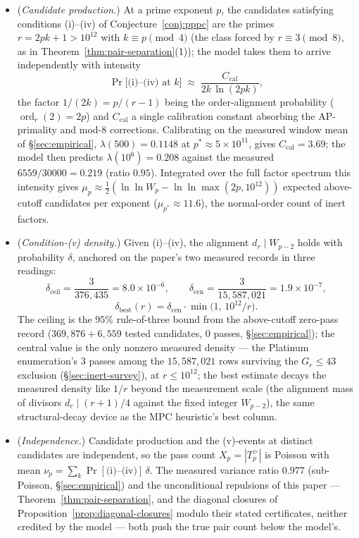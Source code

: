 \documentclass[11pt]{amsart}
\theoremstyle{plain}
\theoremstyle{definition}
\theoremstyle{remark}
\numberwithin{equation}{section}
\newcommand{\ord}{\operatorname{ord}}
\newcommand{\Prob}{\operatorname{Pr}}
\begin{document}
\begin{itemize}
\item[\textbf{M1}] (\emph{Candidate production.}) At a prime exponent
$p$, the candidates satisfying conditions (i)--(iv) of
Conjecture~\ref{conj:pppc} are the primes $r = 2 p k + 1 > 10^{12}$ with
$k \equiv p \pmod 4$ (the class forced by $r \equiv 3 \pmod 8$, as in
Theorem~\ref{thm:pair-separation}(1)); the model takes them to arrive
independently with intensity
\[
  \Prob\big[\text{(i)--(iv) at } k\big] \;\approx\;
  \frac{C_{\mathrm{cal}}}{2 k \,\ln(2 p k)},
\]
the factor $1/(2k) = p/(r-1)$ being the order-alignment probability
($\ord_r(2) = 2p$) and $C_{\mathrm{cal}}$ a single calibration constant
absorbing the AP-primality and mod-$8$ corrections. Calibrating on the
measured window mean of \S\ref{sec:empirical},
$\lambda(500) = 0.1148$ at $p^\ast \approx 5 \times 10^{11}$, gives
$C_{\mathrm{cal}} = 3.69$; the model then predicts
$\lambda(10^6) = 0.208$ against the measured $6559/30000 = 0.219$
(ratio $0.95$). Integrated over the full factor spectrum this intensity
gives $\mu_p \approx \tfrac12(\ln \ln W_p - \ln \ln \max(2p, 10^{12}))$
expected above-cutoff candidates per exponent ($\mu_{p^\ast} \approx
11.6$), the normal-order count of inert factors.
\item[\textbf{M2}] (\emph{Condition-(v) density.}) Given (i)--(iv), the
alignment $d_r \mid W_{p-2}$ holds with probability $\delta$, anchored on
the paper's two measured records in three readings:
\[
  \delta_{\mathrm{ceil}} = \frac{3}{376{,}435} = 8.0 \times 10^{-6},
  \qquad
  \delta_{\mathrm{cen}} = \frac{3}{15{,}587{,}021} = 1.9 \times 10^{-7},
\]
\[
  \delta_{\mathrm{best}}(r) = \delta_{\mathrm{cen}} \cdot
  \min\!\big(1,\, 10^{12}/r\big).
\]
The ceiling is the $95\%$ rule-of-three bound from the above-cutoff
zero-pass record ($369{,}876 + 6{,}559$ tested candidates, $0$ passes,
\S\ref{sec:empirical}); the central value is the only nonzero measured
density --- the Platinum enumeration's $3$ passes among the
$15{,}587{,}021$ rows surviving the $G_r \leq 43$ exclusion
(\S\ref{sec:inert-survey}), at $r \leq 10^{12}$; the best estimate
decays the measured density like $1/r$ beyond the measurement scale
(the alignment mass of divisors $d_r \mid (r+1)/4$ against the fixed
integer $W_{p-2}$), the same structural-decay device as the MPC
heuristic's best column.
\item[\textbf{M3}] (\emph{Independence.}) Candidate production and the
(v)-events at distinct candidates are independent, so the pass count
$X_p = |T_p^{>}|$ is Poisson with mean $\nu_p = \sum_k
\Prob[\text{(i)--(iv)}]\,\delta$. The measured variance ratio $0.977$
(sub-Poisson, \S\ref{sec:empirical}) and the unconditional repulsions of
this paper --- Theorem~\ref{thm:pair-separation}, and the diagonal
closures of Proposition~\ref{prop:diagonal-closures} modulo their stated
certificates, neither credited by the model --- both push the true pair
count below the model's.
\end{itemize}
\end{document}
